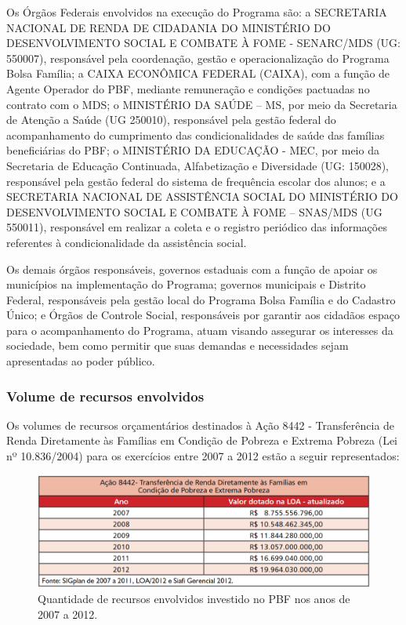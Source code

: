 \documentclass[12pt]{article}
\begin{document}
	Os Órgãos Federais envolvidos na execução do Programa são: a SECRETARIA NACIONAL DE RENDA DE CIDADANIA DO MINISTÉRIO DO DESENVOLVIMENTO SOCIAL E COMBATE À FOME - SENARC/MDS (UG: 550007), responsável pela coordenação, gestão e operacionalização do Programa Bolsa Família; a CAIXA ECONÔMICA FEDERAL (CAIXA), com a função de Agente Operador do PBF, mediante remuneração e condições pactuadas no contrato com o MDS; o MINISTÉRIO DA SAÚDE – MS, por meio da Secretaria de Atenção a Saúde (UG 250010), responsável pela gestão federal do acompanhamento do cumprimento das condicionalidades de saúde das famílias beneficiárias do PBF; o MINISTÉRIO DA EDUCAÇÃO - MEC, por meio da Secretaria de Educação Continuada, Alfabetização e Diversidade (UG: 150028), responsável pela gestão federal do sistema de frequência escolar dos alunos; e a SECRETARIA NACIONAL DE ASSISTÊNCIA SOCIAL DO MINISTÉRIO DO DESENVOLVIMENTO SOCIAL E COMBATE À FOME – SNAS/MDS (UG 550011), responsável em realizar a coleta e o registro periódico das informações referentes à condicionalidade da assistência social.
	
	Os demais órgãos responsáveis, governos estaduais com a função de apoiar os municípios na implementação do Programa; governos municipais e Distrito Federal, responsáveis pela gestão local do Programa Bolsa Família e do Cadastro Único; e Órgãos de Controle Social, responsáveis por garantir aos cidadãos espaço para o acompanhamento do Programa, atuam visando assegurar os interesses da sociedade, bem como permitir que suas demandas e necessidades sejam apresentadas ao poder público.
	
	\subsubsection{Volume de recursos envolvidos}
	\label{sec:vre}
	
	Os volumes de recursos orçamentários destinados à Ação 8442 - Transferência de Renda Diretamente às Famílias em Condição de Pobreza e Extrema Pobreza (Lei nº 10.836/2004) para os exercícios entre 2007 a 2012 estão a seguir representados:
	
	\begin{figure}[H]
		\centering
		\includegraphics[width=1\textwidth]{vre_07-12.png}
		\caption{Quantidade de recursos envolvidos investido no PBF nos anos de 2007 a 2012.}
		\label{fig:vre_07-12}
	\end{figure}
	
\end{document}
